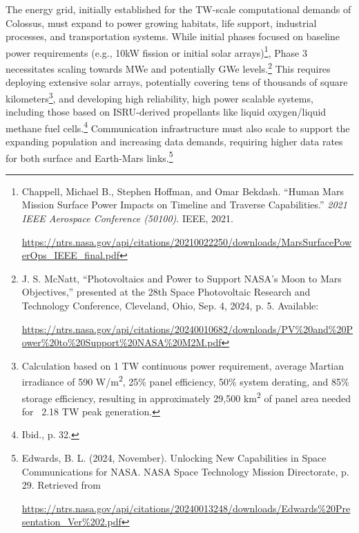 \documentclass[fontsize=10pt, oneside, DIV=calc]{scrartcl}
\begin{document}
\noindent The energy grid, initially established for the TW-scale computational demands of Colossus, must expand to power growing habitats, life support, industrial processes, and transportation systems. While initial phases focused on baseline power requirements (e.g., 10kW fission or initial solar arrays)\footnote{Chappell, Michael B., Stephen Hoffman, and Omar Bekdash. ``Human Mars Mission Surface Power Impacts on Timeline and Traverse Capabilities.'' \textit{2021 IEEE Aerospace Conference (50100)}. IEEE, 2021. 







\href{https://ntrs.nasa.gov/api/citations/20210022250/downloads/MarsSurfacePowerOps\_IEEE\_final.pdf}\url{https://ntrs.nasa.gov/api/citations/20210022250/downloads/MarsSurfacePowerOps\_IEEE\_final.pdf}}, Phase 3 necessitates scaling towards MWe and potentially GWe levels.\footnote{J. S. McNatt, ``Photovoltaics and Power to Support NASA’s Moon to Mars Objectives,'' presented at the 28th Space Photovoltaic Research and Technology Conference, Cleveland, Ohio, Sep. 4, 2024, p. 5. Available: 







\href{https://ntrs.nasa.gov/api/citations/20240010682/downloads/PV\%20and\%20Power\%20to\%20Support\%20NASA\%20M2M.pdf}\url{https://ntrs.nasa.gov/api/citations/20240010682/downloads/PV\%20and\%20Power\%20to\%20Support\%20NASA\%20M2M.pdf}} This requires deploying extensive solar arrays, potentially covering tens of thousands of square kilometers\footnote{Calculation based on 1 TW continuous power requirement, average Martian irradiance of 590 W/m\textsuperscript{2}, 25\% panel efficiency, 50\% system derating, and 85\% storage efficiency, resulting in approximately 29,500 km\textsuperscript{2} of panel area needed for ~2.18 TW peak generation.}, and developing high reliability, high power scalable systems, including those based on ISRU-derived propellants like liquid oxygen/liquid methane fuel cells.\footnote{Ibid., p. 32.} Communication infrastructure must also scale to support the expanding population and increasing data demands, requiring higher data rates for both surface and Earth-Mars links.\footnote{Edwards, B. L. (2024, November). Unlocking New Capabilities in Space Communications for NASA. NASA Space Technology Mission Directorate, p. 29. Retrieved from 







\href{https://ntrs.nasa.gov/api/citations/20240013248/downloads/Edwards\%20Presentation\_Ver\%202.pdf}\url{https://ntrs.nasa.gov/api/citations/20240013248/downloads/Edwards\%20Presentation\_Ver\%202.pdf}}
\end{document}

